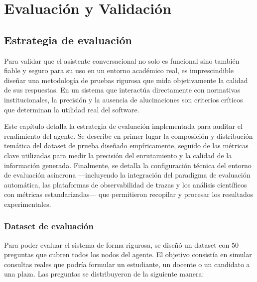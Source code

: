 \documentclass[12pt,a4paper,oneside]{report}
\begin{document}
\part{Evaluación y Validación}

\chapter{Estrategia de evaluación}

Para validar que el asistente conversacional no solo es funcional sino también fiable y seguro para su uso en un entorno académico real, es imprescindible diseñar una metodología de pruebas rigurosa que mida objetivamente la calidad de sus respuestas. En un sistema que interactúa directamente con normativas institucionales, la precisión y la ausencia de alucinaciones son criterios críticos que determinan la utilidad real del software.

Este capítulo detalla la estrategia de evaluación implementada para auditar el rendimiento del agente. Se describe en primer lugar la composición y distribución temática del dataset de prueba diseñado empíricamente, seguido de las métricas clave utilizadas para medir la precisión del enrutamiento y la calidad de la información generada. Finalmente, se detalla la configuración técnica del entorno de evaluación asíncrona —incluyendo la integración del paradigma de evaluación automática, las plataformas de observabilidad de trazas y los análisis científicos con métricas estandarizadas— que permitieron recopilar y procesar los resultados experimentales.

\section{Dataset de evaluación}

Para poder evaluar el sistema de forma rigurosa, se diseñó un dataset con 50 preguntas que cubren todos los nodos del agente. El objetivo consistía en simular consultas reales que podría formular un estudiante, un docente o un candidato a una plaza. Las preguntas se distribuyeron de la siguiente manera:
\end{document}
